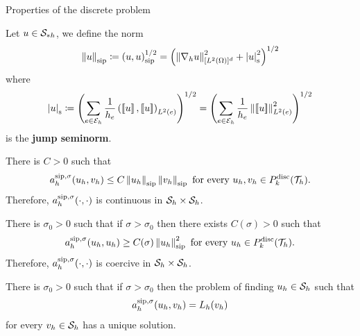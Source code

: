 \begin{frame}[allowframebreaks]{Properties of the discrete problem}

\begin{definicion}
	Let $u\in\S_{*h}$, we define the norm
	\begin{equation*}
	\norma{u}_{\text{sip}}\coloneqq\escalarsip{u}{u}^{1/2}=\left(\norma{\nabla_h u}^2_{[L^2(\Omega)]^d}+\left|u\right|^2_{\text{s}}\right)^{1/2}
	\end{equation*}
	where
	\begin{equation*}
	\left|u\right|_{\text{s}}\coloneqq \left(\sum_{e\in\E_h}\frac{1}{h_e}\escalar{\salto{u}}{\salto{u}}_{L^2(e)}\right)^{1/2}=\left(\sum_{e\in\E_h}\frac{1}{h_e}\norma{\salto{u}}^2_{L^2(e)}\right)^{1/2}
	\end{equation*}
	is the \textbf{jump seminorm}.
\end{definicion}
\framebreak
{\small
\begin{lemma}
	There is $C>0$ such that $$\asip{u_h}{v_h}\leq C\norma{u_h}_{\text{sip}}\normasip{v_h}\text{ for every }u_h,v_h\in\Pd_k(\T_h).$$ Therefore, $\asip{\cdot}{\cdot}$ is continuous in $\S_h\times\S_h$.
\end{lemma}

\begin{lemma}
	\label{lemma:eliptico_coercitividad}
	There is $\sigma_0>0$ such that if $\sigma>\sigma_0$ then there exists $C(\sigma)>0$ such that $$\asip{u_h}{u_h}\geq C(\sigma)\norma{u_h}_{\text{sip}}^2\text{ for every }u_h\in\Pd_k(\T_h).$$ Therefore, $\asip{\cdot}{\cdot}$ is coercive in $\S_h\times\S_h$.
\end{lemma}
}
\framebreak
\begin{lemma}
	\label{lemma:buen_planteamiento_form_var_DG_elpitica}
	There is $\sigma_0>0$ such that if $\sigma>\sigma_0$ then the problem of finding $u_h\in\S_h$ such that $$\asip{u_h}{v_h}=L_h(v_h)$$ for every $v_h\in\S_h$ has a unique solution.
\end{lemma}

\end{frame}

